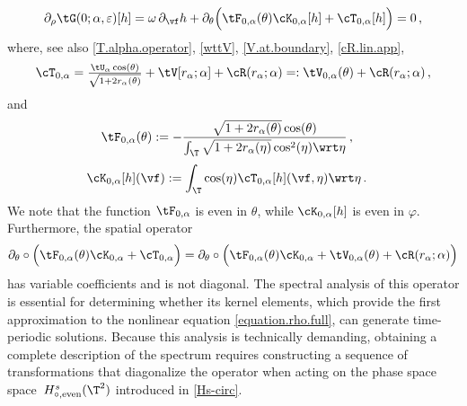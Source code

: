 \documentclass[a4paper,reqno,10pt]{article}
\newcommand{\pa}{\partial}
\begin{document}
\begin{equation}\label{linear.rho.full}
	\partial_\rho\tG(0;\alpha,\varepsilon)[h]=\omega\,\pa_{\vf} h + \pa_{\theta} \Big( \tF_{0,\alpha}(\theta) \cK_{0,\alpha}[h] + \cT_{0,\alpha}[h] \Big) = 0 \,,
\end{equation}
where, see also \eqref{T.alpha.operator}, \eqref{wttV}, \eqref{V.at.boundary}, \eqref{cR.lin.app},
\begin{equation}\label{cT.0.alpha}
	\cT_{0,\alpha}  =  \tfrac{\tU_{\alpha} \cos(\theta)}{\sqrt{1+2r_\alpha(\theta)}} + \tV[r_\alpha;\alpha] + \cR(r_\alpha;\alpha) =: \tV_{0,\alpha}(\theta) + \cR(r_\alpha;\alpha)\,,
\end{equation}
and
	\begin{equation}\label{smoothF0}
	\begin{aligned}
		\tF_{0,\alpha}(\theta) & := - \frac{\sqrt{1+2r_\alpha(\theta)}\cos(\theta)}{\int_{\T}\sqrt{1+2r_\alpha(\eta)}\cos^2(\eta)\wrt\eta}  \,,
	\end{aligned}
\end{equation}
\begin{equation}\label{smoothK0}
	\begin{aligned}
		\cK_{0,\alpha}[h](\vf) & := \int_{\T} \cos(\eta) \cT_{0,\alpha}[h](\vf,\eta) \wrt\eta \,.
	\end{aligned}
\end{equation}
We note that the function $\tF_{0,\alpha}$ is even in $\theta$, while $\cK_{0,\alpha}[h]$ is even in $\varphi$. Furthermore, the spatial operator
\begin{equation}
\pa_{\theta}\circ \Big( \tF_{0,\alpha}(\theta)\cK_{0,\alpha} + \cT_{0,\alpha} \Big)
= \pa_{\theta}\circ \Big( \tF_{0,\alpha}(\theta)\cK_{0,\alpha}+\tV_{0,\alpha}(\theta) + \cR(r_\alpha;\alpha) \Big)
\end{equation}
has variable coefficients and is not diagonal. The spectral analysis of this operator is essential for determining whether its kernel elements, which provide the first approximation to the nonlinear equation \eqref{equation.rho.full}, can generate time-periodic solutions. Because this analysis is technically demanding, obtaining a complete description of the spectrum requires constructing a sequence of transformations that diagonalize the operator when acting on the phase space \mbox{space $H^s_{\circ,\textnormal{even}}(\T^2)$} introduced in \eqref{Hs-circ}.

\medskip
\end{document}
